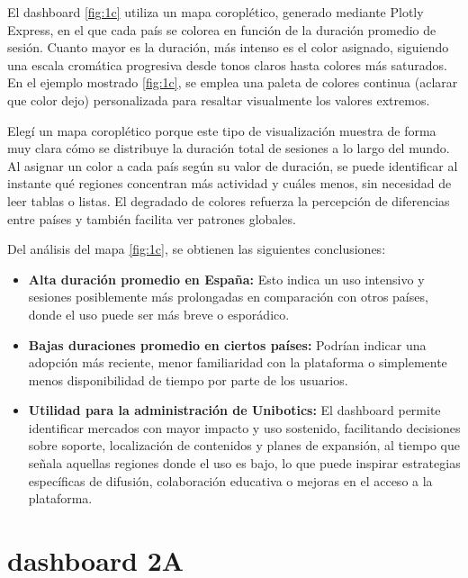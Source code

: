 \documentclass[a4paper, 12pt]{book}
\begin{document}
El dashboard \ref{fig:1c} utiliza un mapa coroplético, generado mediante Plotly Express, en el que cada país se colorea en función de la duración promedio de sesión. Cuanto mayor es la duración, más intenso es el color asignado, siguiendo una escala cromática progresiva desde tonos claros hasta colores más saturados. En el ejemplo mostrado \ref{fig:1c}, se emplea una paleta de colores continua (aclarar que color dejo) personalizada para resaltar visualmente los valores extremos.

Elegí un mapa coroplético porque este tipo de visualización muestra de forma muy clara cómo se distribuye la duración total de sesiones a lo largo del mundo. Al asignar un color a cada país según su valor de duración, se puede identificar al instante qué regiones concentran más actividad y cuáles menos, sin necesidad de leer tablas o listas. El degradado de colores refuerza la percepción de diferencias entre países y también facilita ver patrones globales.

Del análisis del mapa \ref{fig:1c}, se obtienen las siguientes conclusiones:

\begin{itemize}

  \item \textbf{Alta duración promedio en España:} Esto indica un uso intensivo y sesiones posiblemente más prolongadas en comparación con otros países, donde el uso puede ser más breve o esporádico.

  \item \textbf{Bajas duraciones promedio en ciertos países:} Podrían indicar una adopción más reciente, menor familiaridad con la plataforma o simplemente menos disponibilidad de tiempo por parte de los usuarios.

  \item \textbf{Utilidad para la administración de Unibotics:}  El dashboard permite identificar mercados con mayor impacto y uso sostenido, facilitando decisiones sobre soporte, localización de contenidos y planes de expansión, al tiempo que señala aquellas regiones donde el uso es bajo, lo que puede inspirar estrategias específicas de difusión, colaboración educativa o mejoras en el acceso a la plataforma.
  
\end{itemize}


\section{dashboard 2A}
\end{document}
